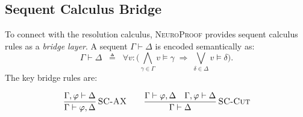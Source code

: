 \documentclass[conference]{IEEEtran}
\newcommand{\entails}{\vDash}
\newcommand{\proves}{\vdash}
\newcommand{\NP}{\textsc{NeuroProof}}
\newcommand{\infrule}[3]{
  \dfrac{\displaystyle #2}{\displaystyle #3}\,\textsc{#1}
}
\begin{document}
\subsection{Sequent Calculus Bridge}

To connect with the resolution calculus, \NP{} provides sequent
calculus rules as a \emph{bridge layer}.  A sequent
$\Gamma \proves \Delta$ is encoded semantically as:
\begin{equation}
  \Gamma \proves \Delta \;\;\triangleq\;\;
  \forall v:\bigl(\textstyle\bigwedge_{\gamma \in \Gamma}
    v \entails \gamma \;\Rightarrow\;
    \textstyle\bigvee_{\delta \in \Delta} v \entails \delta\bigr).
\end{equation}
The key bridge rules are:

\medskip
\begin{gather}
  \infrule{SC-AX}
    {\Gamma, \varphi \proves \Delta}
    {\Gamma \proves \varphi, \Delta}
  \qquad
  \infrule{SC-Cut}
    {\Gamma \proves \varphi, \Delta \quad
     \Gamma, \varphi \proves \Delta}
    {\Gamma \proves \Delta}
  \label{eq:sc-bridge}
\end{gather}
\end{document}
